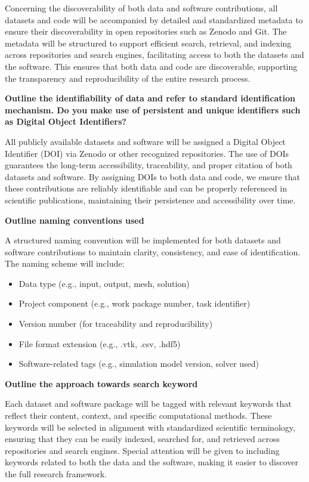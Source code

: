 \documentclass[a4paper,12pt]{article}
\begin{document}
Concerning the discoverability of both data and software contributions, all datasets and code will be accompanied by detailed and standardized metadata to ensure their discoverability in open repositories such as Zenodo and Git. The metadata will be structured to support efficient search, retrieval, and indexing across repositories and search engines, facilitating access to both the datasets and the software. This ensures that both data and code are discoverable, supporting the transparency and reproducibility of the entire research process.

\noindent \textbf{Outline the identifiability of data and refer to standard identification mechanism. Do you make use of persistent and unique identifiers such as Digital Object Identifiers?}

All publicly available datasets and software will be assigned a Digital Object Identifier (DOI) via Zenodo or other recognized repositories. The use of DOIs guarantees the long-term accessibility, traceability, and proper citation of both datasets and software. By assigning DOIs to both data and code, we ensure that these contributions are reliably identifiable and can be properly referenced in scientific publications, maintaining their persistence and accessibility over time.

\noindent \textbf{Outline naming conventions used}

A structured naming convention will be implemented for both datasets and software contributions to maintain clarity, consistency, and ease of identification. The naming scheme will include:
\begin{itemize}
\item Data type (e.g., input, output, mesh, solution)
\item Project component (e.g., work package number, task identifier)
\item Version number (for traceability and reproducibility)
\item File format extension (e.g., .vtk, .csv, .hdf5)
\item Software-related tags (e.g., simulation model version, solver used)
\end{itemize}


\noindent \textbf{Outline the approach towards search keyword}

Each dataset and software package will be tagged with relevant keywords that reflect their content, context, and specific computational methods. These keywords will be selected in alignment with standardized scientific terminology, ensuring that they can be easily indexed, searched for, and retrieved across repositories and search engines. Special attention will be given to including keywords related to both the data and the software, making it easier to discover the full research framework.
\end{document}
